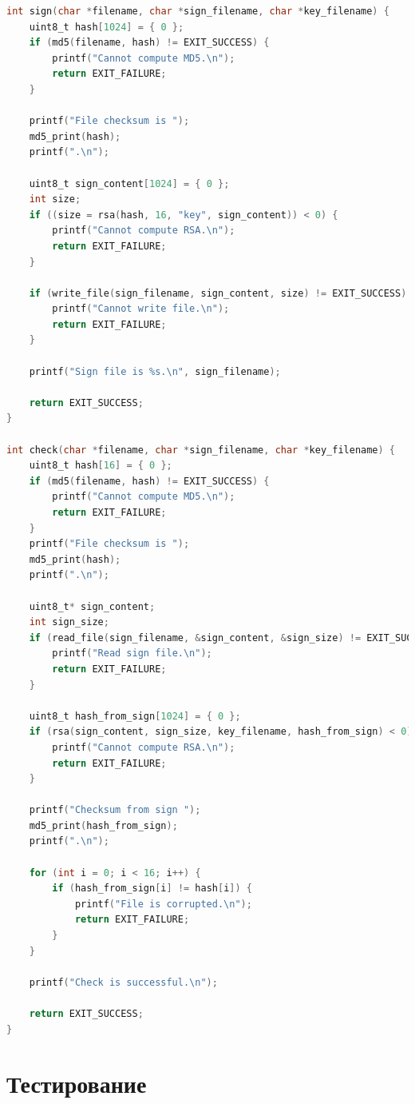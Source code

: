 \begin{lstlisting}[language=C, label=lst:rsa, caption={Реализация алгоритма цифровой подписи на основе MD5 и RSA}]
int sign(char *filename, char *sign_filename, char *key_filename) {
    uint8_t hash[1024] = { 0 };
    if (md5(filename, hash) != EXIT_SUCCESS) {
        printf("Cannot compute MD5.\n");
        return EXIT_FAILURE;
    }

    printf("File checksum is ");
    md5_print(hash);
    printf(".\n");

    uint8_t sign_content[1024] = { 0 };
    int size;
    if ((size = rsa(hash, 16, "key", sign_content)) < 0) {
        printf("Cannot compute RSA.\n");
        return EXIT_FAILURE;
    }

    if (write_file(sign_filename, sign_content, size) != EXIT_SUCCESS) {
        printf("Cannot write file.\n");
        return EXIT_FAILURE;
    }

    printf("Sign file is %s.\n", sign_filename);

    return EXIT_SUCCESS;
}

int check(char *filename, char *sign_filename, char *key_filename) {
    uint8_t hash[16] = { 0 };
    if (md5(filename, hash) != EXIT_SUCCESS) {
        printf("Cannot compute MD5.\n");
        return EXIT_FAILURE;
    }
    printf("File checksum is ");
    md5_print(hash);
    printf(".\n");

    uint8_t* sign_content;
    int sign_size;
    if (read_file(sign_filename, &sign_content, &sign_size) != EXIT_SUCCESS) {
        printf("Read sign file.\n");
        return EXIT_FAILURE;
    }

    uint8_t hash_from_sign[1024] = { 0 };
    if (rsa(sign_content, sign_size, key_filename, hash_from_sign) < 0) {
        printf("Cannot compute RSA.\n");
        return EXIT_FAILURE;
    }

    printf("Checksum from sign ");
    md5_print(hash_from_sign);
    printf(".\n");

    for (int i = 0; i < 16; i++) {
        if (hash_from_sign[i] != hash[i]) {
            printf("File is corrupted.\n");
            return EXIT_FAILURE;
        }
    }

    printf("Check is successful.\n");

    return EXIT_SUCCESS;
}
\end{lstlisting}



\section{Тестирование}

